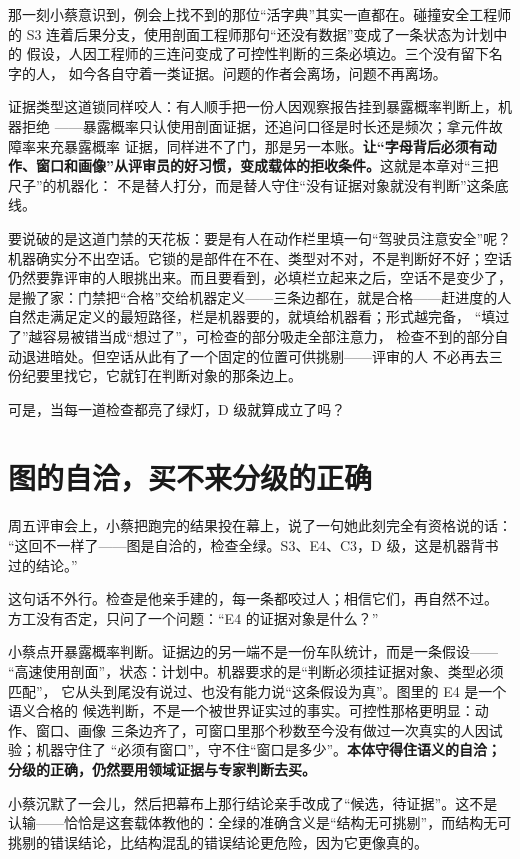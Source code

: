 那一刻小蔡意识到，例会上找不到的那位“活字典”其实一直都在。碰撞安全工程师的
S3 连着后果分支，使用剖面工程师那句“还没有数据”变成了一条状态为计划中的
假设，人因工程师的三连问变成了可控性判断的三条必填边。三个没有留下名字的人，
如今各自守着一类证据。问题的作者会离场，问题不再离场。

证据类型这道锁同样咬人：有人顺手把一份人因观察报告挂到暴露概率判断上，机器拒绝
——暴露概率只认使用剖面证据，还追问口径是时长还是频次；拿元件故障率来充暴露概率
证据，同样进不了门，那是另一本账。\textbf{让“字母背后必须有动作、窗口和画像”从评审员的好习惯，变成载体的拒收条件。}这就是本章对“三把尺子”的机器化：
不是替人打分，而是替人守住“没有证据对象就没有判断”这条底线。

要说破的是这道门禁的天花板：要是有人在动作栏里填一句“驾驶员注意安全”呢？
机器确实分不出空话。它锁的是部件在不在、类型对不对，不是判断好不好；空话
仍然要靠评审的人眼挑出来。而且要看到，必填栏立起来之后，空话不是变少了，
是搬了家：门禁把“合格”交给机器定义——三条边都在，就是合格——赶进度的人
自然走满足定义的最短路径，栏是机器要的，就填给机器看；形式越完备，
“填过了”越容易被错当成“想过了”，可检查的部分吸走全部注意力，
检查不到的部分自动退进暗处。但空话从此有了一个固定的位置可供挑剔——评审的人
不必再去三份纪要里找它，它就钉在判断对象的那条边上。

可是，当每一道检查都亮了绿灯，D 级就算成立了吗？

\section{图的自洽，买不来分级的正确}

周五评审会上，小蔡把跑完的结果投在幕上，说了一句她此刻完全有资格说的话：
“这回不一样了——图是自洽的，检查全绿。S3、E4、C3，D 级，这是机器背书过的结论。”

这句话不外行。检查是他亲手建的，每一条都咬过人；相信它们，再自然不过。
方工没有否定，只问了一个问题：“E4 的证据对象是什么？”

小蔡点开暴露概率判断。证据边的另一端不是一份车队统计，而是一条假设——
“高速使用剖面”，状态：计划中。机器要求的是“判断必须挂证据对象、类型必须匹配”，
它从头到尾没有说过、也没有能力说“这条假设为真”。图里的 E4 是一个语义合格的
候选判断，不是一个被世界证实过的事实。可控性那格更明显：动作、窗口、画像
三条边齐了，可窗口里那个秒数至今没有做过一次真实的人因试验；机器守住了
“必须有窗口”，守不住“窗口是多少”。\textbf{本体守得住语义的自洽；分级的正确，仍然要用领域证据与专家判断去买。}

小蔡沉默了一会儿，然后把幕布上那行结论亲手改成了“候选，待证据”。这不是
认输——恰恰是这套载体教他的：全绿的准确含义是“结构无可挑剔”，而结构无可
挑剔的错误结论，比结构混乱的错误结论更危险，因为它更像真的。

